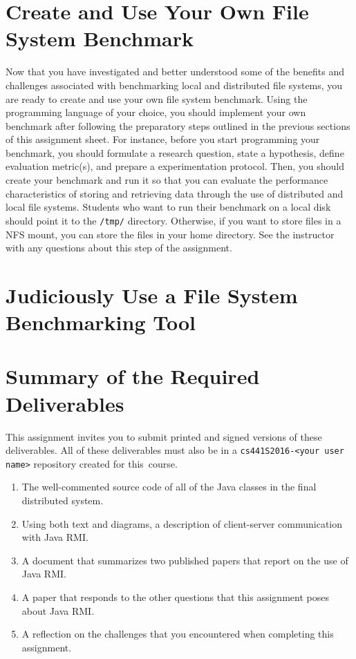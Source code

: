 \section*{Create and Use Your Own File System Benchmark}

Now that you have investigated and better understood some of the benefits and challenges associated with benchmarking
local and distributed file systems, you are ready to create and use your own file system benchmark. Using the
programming language of your choice, you should implement your own benchmark after following the preparatory steps
outlined in the previous sections of this assignment sheet. For instance, before you start programming your benchmark,
you should formulate a research question, state a hypothesis, define evaluation metric(s), and prepare a experimentation
protocol. Then, you should create your benchmark and run it so that you can evaluate the performance characteristics of
storing and retrieving data through the use of distributed and local file systems. Students who want to run their
benchmark on a local disk should point it to the {\tt /tmp/} directory. Otherwise, if you want to store files in a NFS
mount, you can store the files in your home directory. See the instructor with any questions about this step of the
assignment.

\section*{Judiciously Use a File System Benchmarking Tool}


\section*{Summary of the Required Deliverables}

This assignment invites you to submit printed and signed versions of these deliverables. All of these deliverables must
also be in a {\tt cs441S2016-<your user name>} repository created for \mbox{this course}.

\vspace*{-.1in}

\begin{enumerate}
  \itemsep 0em

  \item The well-commented source code of all of the Java classes in the final distributed system.

  \item Using both text and diagrams, a description of client-server communication with Java RMI.

  \item A document that summarizes two published papers that report on the use of Java RMI.

  \item A paper that responds to the other questions that this assignment poses about Java RMI.

  \item A reflection on the challenges that you encountered when completing this assignment.

\end{enumerate}

